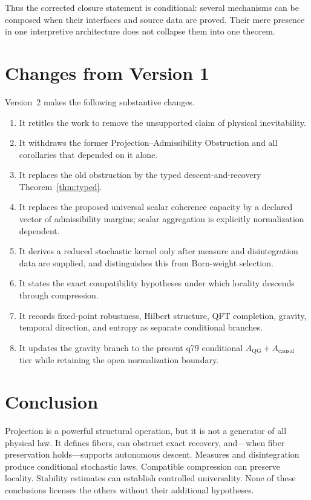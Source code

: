 \documentclass[11pt]{article}
\begin{document}
Thus the corrected closure statement is conditional: several mechanisms can
be composed when their interfaces and source data are proved.  Their mere
presence in one interpretive architecture does not collapse them into one
theorem.

\section{Changes from Version 1}

Version~2 makes the following substantive changes.
\begin{enumerate}
\item It retitles the work to remove the unsupported claim of physical
inevitability.
\item It withdraws the former Projection--Admissibility Obstruction and all
corollaries that depended on it alone.
\item It replaces the old obstruction by the typed descent-and-recovery
Theorem~\ref{thm:typed}.
\item It replaces the proposed universal scalar coherence capacity by a
declared vector of admissibility margins; scalar aggregation is explicitly
normalization dependent.
\item It derives a reduced stochastic kernel only after measure and
disintegration data are supplied, and distinguishes this from Born-weight
selection.
\item It states the exact compatibility hypotheses under which locality
descends through compression.
\item It records fixed-point robustness, Hilbert structure, QFT completion,
gravity, temporal direction, and entropy as separate conditional branches.
\item It updates the gravity branch to the present q79 conditional
$A_{\mathrm{QG}}+A_{\mathrm{causal}}$ tier while retaining the open
normalization boundary.
\end{enumerate}

\section{Conclusion}

Projection is a powerful structural operation, but it is not a generator of
all physical law.  It defines fibers, can obstruct exact recovery, and---when
fiber preservation holds---supports autonomous descent.  Measures and
disintegration produce conditional stochastic laws.  Compatible compression
can preserve locality.  Stability estimates can establish controlled
universality.  None of these conclusions licenses the others without their
additional hypotheses.
\end{document}
